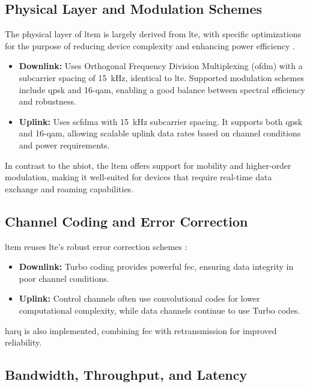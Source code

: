 \documentclass[12pt, english, openany]{book}
\begin{document}
\subsection{Physical Layer and Modulation Schemes}

The physical layer of \gls{ltem} is largely derived from \gls{lte}, with specific optimizations for the purpose of reducing device complexity and enhancing power efficiency \parencite{LTE_SYSTEM}.

\begin{itemize}
    \item \textbf{Downlink:} Uses Orthogonal Frequency Division Multiplexing (\gls{ofdm}) with a subcarrier spacing of \SI{15}{kHz}, identical to \gls{lte}. Supported modulation schemes include \gls{qpsk} and 16-\gls{qam}, enabling a good balance between spectral efficiency and robustness.

    \item \textbf{Uplink:} Uses \gls{scfdma} with \SI{15}{kHz} subcarrier spacing. It supports both \gls{qpsk} and 16-\gls{qam}, allowing scalable uplink data rates based on channel conditions and power requirements.
\end{itemize}

In contrast to the \gls{nbiot}, the \gls{ltem} offers support for mobility and higher-order modulation, making it well-suited for devices that require real-time data exchange and roaming capabilities.

\subsection{Channel Coding and Error Correction}

\gls{ltem} reuses \gls{lte}'s robust error correction schemes \parencite{LTE_SYSTEM}:

\begin{itemize}
    \item \textbf{Downlink:} Turbo coding provides powerful \gls{fec}, ensuring data integrity in poor channel conditions.
    \item \textbf{Uplink:} Control channels often use convolutional codes for lower computational complexity, while data channels continue to use Turbo codes.
\end{itemize}

\gls{harq} is also implemented, combining \gls{fec} with retransmission for improved reliability.

\subsection{Bandwidth, Throughput, and Latency}
\end{document}
